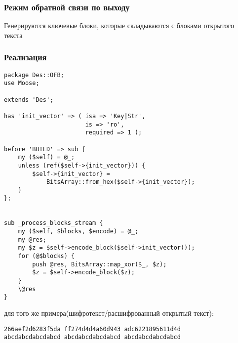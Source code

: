 \documentclass[10pt,a4paper]{article}
\begin{document}
\subsubsection*{Режим обратной связи по выходу}
Генерируются ключевые блоки, которые складываются с блоками открытого
текста
\subsubsection*{Реализация}
\begin{lstlisting}
package Des::OFB;
use Moose;

extends 'Des';

has 'init_vector' => ( isa => 'Key|Str',
                       is => 'ro',
                       required => 1 );

before 'BUILD' => sub {
    my ($self) = @_;
    unless (ref($self->{init_vector})) {
        $self->{init_vector} =
            BitsArray::from_hex($self->{init_vector});
    }
};


sub _process_blocks_stream {
    my ($self, $blocks, $encode) = @_;
    my @res;
    my $z = $self->encode_block($self->init_vector());
    for (@$blocks) {
        push @res, BitsArray::map_xor($_, $z);
        $z = $self->encode_block($z);
    }
    \@res
}
\end{lstlisting}
{} для того же примера(шифротекст/расшифрованный открытый
текст):
\begin{lstlisting}
266aef2d6283f5da ff274d4d4a60d943 adc6221895611d4d 
abcdabcdabcdabcd abcdabcdabcdabcd abcdabcdabcdabcd 
\end{lstlisting}
\end{document}

